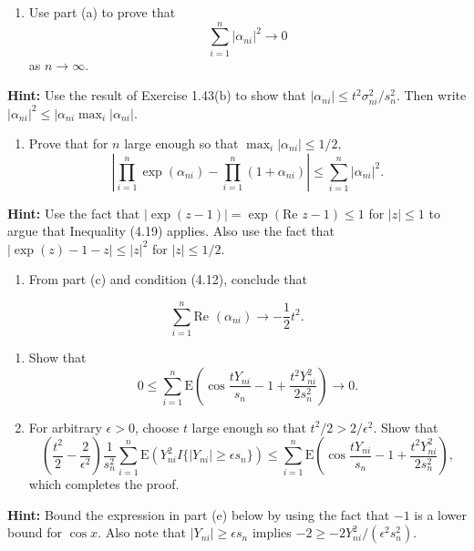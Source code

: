 \documentclass[12pt,]{article}
\providecommand{\tightlist}{%
  \setlength{\itemsep}{0pt}\setlength{\parskip}{0pt}}
\begin{document}
\begin{enumerate}
\def\labelenumi{(\alph{enumi})}
\setcounter{enumi}{1}
\tightlist
\item
  Use part (a) to prove that
  \[\sum_{i=1}^n |\alpha_{ni}|^2\rightarrow 0\] as
  \(n\rightarrow \infty.\)
\end{enumerate}

\textbf{Hint:} Use the result of Exercise 1.43(b) to show that
\(|\alpha_{ni}| \le t^2\sigma^2_{ni}/s_n^2.\) Then write
\(|\alpha_{ni}|^2\le |\alpha_{ni}\max_i|\alpha_{ni}|.\)

\begin{enumerate}
\def\labelenumi{(\alph{enumi})}
\setcounter{enumi}{2}
\tightlist
\item
  Prove that for \(n\) large enough so that
  \(\max_i|\alpha_{ni}|\le 1/2,\)
  \[\left|\prod_{i=1}^n \exp(\alpha_{ni})-\prod_{i=1}^n(1+\alpha_{ni})\right|\le \sum_{i=1}^n|\alpha_{ni}|^2.\]
\end{enumerate}

\textbf{Hint:} Use the fact that
\(|\exp(z-1)|=\exp(\text{Re } z-1)\le 1\) for \(|z| \le 1\) to argue
that Inequality (4.19) applies. Also use the fact that
\(|\exp(z)-1-z|\le |z|^2\) for \(|z|\le 1/2.\)

\begin{enumerate}
\def\labelenumi{(\alph{enumi})}
\setcounter{enumi}{3}
\tightlist
\item
  From part (c) and condition (4.12), conclude that
\end{enumerate}

\[\sum_{i=1}^n \text{Re } (\alpha_{ni})\rightarrow -\frac{1}{2}t^2.\]

\begin{enumerate}
\def\labelenumi{(\alph{enumi})}
\setcounter{enumi}{4}
\tightlist
\item
  Show that
  \[0\le \sum_{i=1}^n\text{E}\left(\cos\frac{tY_{ni}}{s_n}-1+\frac{t^2Y_{ni}^2}{2s_n^2}\right)\rightarrow 0.\]
\item
  For arbitrary \(\epsilon>0\), choose \(t\) large enough so that
  \(t^2/2 > 2/\epsilon^2\). Show that
  \[\left(\frac{t^2}{2}-\frac{2}{\epsilon^2}\right)\frac{1}{s_n^2}\sum_{i=1}^n\text{E}(Y_{ni}^2I\{|Y_{ni}|\ge\epsilon s_n\})\le \sum_{i=1}^n\text{E}\left(\cos\frac{tY_{ni}}{s_n}-1+\frac{t^2Y_{ni}^2}{2s_n^2}\right),\]
  which completes the proof.
\end{enumerate}

\textbf{Hint:} Bound the expression in part (e) below by using the fact
that \(-1\) is a lower bound for \(\cos x\). Also note that
\(|Y_{ni}|\ge \epsilon s_n\) implies
\(-2\ge -2Y_{ni}^2/(\epsilon^2 s_n^2)\).
\end{document}
